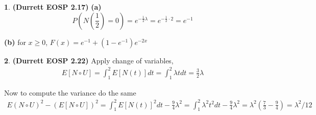 \documentclass{article}
\theoremstyle{definition}
\newtheorem{pb}{}
\begin{document}
    \begin{pb}\textbf{(Durrett EOSP 2.17)}
        \textbf{(a)} \[P(N(\frac12) = 0) = e^{-\frac12 \lambda} = e^{-\frac12 \cdot 2} = e^{-1}\]

        \textbf{(b)} for \(x \geq 0\), \(F(x) = e^{-1} + (1-e^{-1})e^{- 2x}\)
    \end{pb}
    \begin{pb}\textbf{(Durrett EOSP 2.22)}
        Apply change of variables,
        \begin{align*}
            E [N\circ U] = \int_1^2 E[N(t)]dt = \int_1^2 \lambda t dt = \frac{3}{2} \lambda
        \end{align*}
    \end{pb}
    Now to compute the variance do the same
    \begin{align*}
        E(N\circ U)^2 - (E[N\circ U])^2 = \int_1^2 E[N(t)]^2dt - \frac94 \lambda^2 = \int_1^2 \lambda^2 t^2 dt - \frac94 \lambda^2 = \lambda^2 (\frac73 - \frac94) = \lambda^2/12
    \end{align*}
\end{document}
